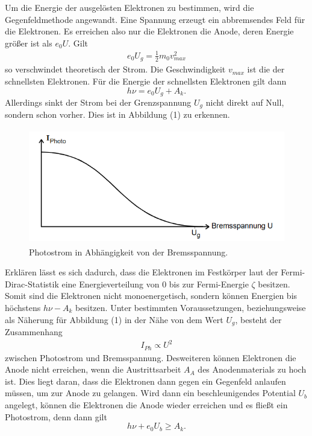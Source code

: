 Um die Energie der ausgelösten Elektronen zu bestimmen, wird die Gegenfeldmethode angewandt.
Eine Spannung erzeugt ein abbremsendes Feld für die Elektronen. Es erreichen also nur die Elektronen die Anode, deren Energie größer ist als $e_0 U$.
Gilt
\begin{align}
  e_0 U_g = \frac{1}{2} m_0 v_{max}^2
\end{align}
so verschwindet theoretisch der Strom. Die Geschwindigkeit $v_{max}$ ist die der schnellsten Elektronen.
Für die Energie der schnellsten Elektronen gilt dann
\begin{equation}
  h \nu = e_0 U_g  + A_k .
\end{equation}
Allerdings sinkt der Strom bei der Grenzspannung $U_g$ nicht direkt auf Null, sondern schon vorher. Dies ist in Abbildung (1) zu erkennen. 
\begin{figure}[H]
  \centering
  \includegraphics[height=5cm]{strom.PNG}
  \caption{Photostrom in Abhängigkeit von der Bremsspannung. \cite{kent}}
  \label{fig:kathode}
\end{figure}
Erklären lässt es sich dadurch, dass die Elektronen im Festkörper laut der Fermi-Dirac-Statistik eine Energieverteilung von $0$ bis zur Fermi-Energie $\zeta$ besitzen. Somit sind die Elektronen nicht monoenergetisch, sondern können Energien bis höchstens $h \nu - A_k$ besitzen.
Unter bestimmten Voraussetzungen, beziehungsweise als Näherung für Abbildung (1) in der Nähe von dem Wert $U_g$, besteht der Zusammenhang
\begin{align*}
  I_{Ph} \propto U^2
\end{align*}
zwischen Photostrom und Bremsspannung.
Desweiteren können Elektronen die Anode nicht erreichen, wenn die Austrittsarbeit $A_A$ des Anodenmaterials zu hoch ist. Dies liegt daran, dass die Elektronen dann gegen ein Gegenfeld anlaufen müssen, um zur Anode zu gelangen. Wird dann ein beschleunigendes Potential $U_b$ angelegt, können die Elektronen die Anode wieder erreichen und es fließt ein Photostrom, denn dann gilt
\begin{equation}
  h \nu + e_0 U_b  \geq  A_k .
\end{equation}





